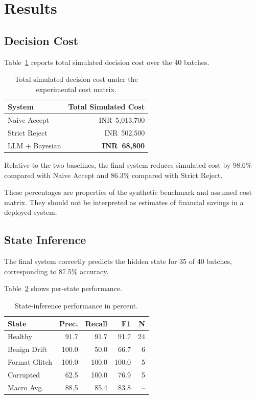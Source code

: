 \documentclass{article}
\begin{document}
\section{Results}

\subsection{Decision Cost}

Table~\ref{tab:costresults} reports total simulated decision cost over the 40 batches.

\begin{table}[t]
\centering
\begin{tabular}{lr}
\toprule
System & Total Simulated Cost \\
\midrule
Naive Accept & INR~5,013,700 \\
Strict Reject & INR~502,500 \\
LLM + Bayesian & \textbf{INR~68,800} \\
\bottomrule
\end{tabular}
\caption{Total simulated decision cost under the experimental cost matrix.}
\label{tab:costresults}
\end{table}

Relative to the two baselines, the final system reduces simulated cost by 98.6\% compared with Naive Accept and 86.3\% compared with Strict Reject.

These percentages are properties of the synthetic benchmark and assumed cost matrix. They should not be interpreted as estimates of financial savings in a deployed system.


\subsection{State Inference}

The final system correctly predicts the hidden state for 35 of 40 batches, corresponding to 87.5\% accuracy.

Table~\ref{tab:classification} shows per-state performance.

\begin{table}[t]
\centering
\small
\begin{tabular}{lrrrr}
\toprule
State & Prec. & Recall & F1 & N \\
\midrule
Healthy       & 91.7 & 91.7 & 91.7 & 24 \\
Benign Drift  & 100.0 & 50.0 & 66.7 & 6 \\
Format Glitch & 100.0 & 100.0 & 100.0 & 5 \\
Corrupted     & 62.5 & 100.0 & 76.9 & 5 \\
\midrule
Macro Avg.    & 88.5 & 85.4 & 83.8 & -- \\
\bottomrule
\end{tabular}
\caption{State-inference performance in percent.}
\label{tab:classification}
\end{table}
\end{document}
